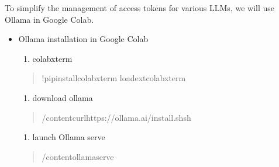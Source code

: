 \documentclass[letterpaper,11pt,english]{sphinxmanual}
\begin{document}
\sphinxAtStartPar
To simplify the management of access tokens for various LLMs, we will use Ollama in Google Colab.
\begin{itemize}
\item {} 
\sphinxAtStartPar
Ollama installation in Google Colab
\begin{enumerate}
%
\item {} 
\sphinxAtStartPar
colab\sphinxhyphen{}xterm

\end{enumerate}
\begin{quote}

\begin{sphinxVerbatim}[commandchars=\\\{\}]
!pipinstallcolab\PYGZhy{}xterm
\PYGZpc{}load\PYGZus{}extcolabxterm
\end{sphinxVerbatim}
\end{quote}
\begin{enumerate}
%
\setcounter{enumi}{1}
\item {} 
\sphinxAtStartPar
download ollama

\end{enumerate}
\begin{quote}

\begin{sphinxVerbatim}[commandchars=\\\{\}]
/content\PYGZsh{}curlhttps://ollama.ai/install.shsh
\end{sphinxVerbatim}

\begin{figure}[htbp]
\centering

\noindent{}
\end{figure}
\end{quote}
\begin{enumerate}
%
\setcounter{enumi}{2}
\item {} 
\sphinxAtStartPar
launch Ollama serve

\end{enumerate}
\begin{quote}

\begin{sphinxVerbatim}[commandchars=\\\{\}]
/content\PYGZsh{}ollamaserve
\end{sphinxVerbatim}


\end{quote}
\end{itemize}
\end{document}
